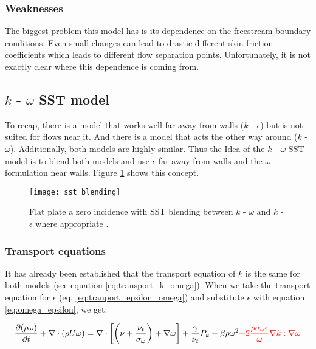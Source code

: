 \subsubsection{Weaknesses}
The biggest problem this model has is its dependence on the freestream boundary
conditions. Even small changes can lead to drastic different skin friction
coefficients which leads to different flow separation points. Unfortunately, it
is not exactly clear where this dependence is coming from.
\cite{cfd101_k-omega}




\subsection{$k$ - $\omega$ SST model}
To recap, there is a model that works well far away from walls ($k$ -
$\epsilon$) but is not suited for flows near it. And there is a model that acts
the other way around ($k$ - $\omega$). Additionally, both models are highly
similar. Thus the Idea of the $k$ - $\omega$ SST model is to blend both models
and use $\epsilon$ far away from walls and the $\omega$ formulation near walls.
Figure \ref{fig:sst_blending} shows this concept.

\begin{figure}[H] \centering
    \texttt{[image: sst\_blending]}
    \caption{Flat plate a zero incidence with SST blending between $k$ -
    $\omega$ and $k$ - $\epsilon$ where appropriate \cite{cfd101_k-omega}.}
    \label{fig:sst_blending}
\end{figure}


\subsubsection{Transport equations}
It has already been established that the transport equation of $k$ is the same
for both models (see equation \ref{eq:transport_k_omega}). When we take the
transport equation for $\epsilon$ (eq. \ref{eq:tranport_epsilon_omega}) and
substitute $\epsilon$ with equation \ref{eq:omega_epsilon}, we get:

\begin{equation}
    \frac{\partial (\rho \omega)}{\partial t} + 
    \nabla \cdot (\rho U \omega) =
    \nabla \cdot \left[ 
        \left( \nu + \frac{\nu_t}{\sigma_{\omega}}\right) + \nabla  \omega
    \right] + \frac{\gamma}{\nu_t} P_k - \beta \rho \omega^2 
    \textcolor{red}{
        + 2 \frac{\rho \sigma_{\omega 2}}{\omega} \nabla k : \nabla \omega
    }
\end{equation}


